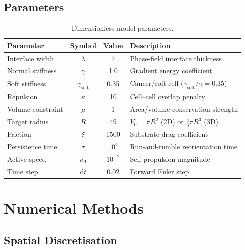 \documentclass[11pt]{article}
\newcommand{\vA}{v_{\!A}}
\newcommand{\taut}{\tau}
\begin{document}
\subsection{Parameters}

\begin{table}[H]
\centering
\caption{Dimensionless model parameters.}
\label{tab:params}
\begin{tabular}{lccl}
\toprule
Parameter & Symbol & Value & Description \\
\midrule
Interface width     & $\lambda$ & 7          & Phase-field interface thickness \\
Normal stiffness    & $\gamma$  & 1.0        & Gradient energy coefficient \\
Soft stiffness      & $\gamma_{\mathrm{soft}}$ & 0.35 & Cancer/soft cell ($\gamma_{\mathrm{soft}}/\gamma = 0.35$) \\
Repulsion           & $\kappa$  & 10         & Cell--cell overlap penalty \\
Volume constraint   & $\mu$     & 1          & Area/volume conservation strength \\
Target radius       & $R$       & 49         & $V_0 = \pi R^2$ (2D) or $\frac{4}{3}\pi R^3$ (3D) \\
Friction            & $\xi$     & 1500       & Substrate drag coefficient \\
Persistence time    & $\taut$   & $10^4$     & Run-and-tumble reorientation time \\
Active speed        & $\vA$     & $10^{-2}$  & Self-propulsion magnitude \\
Time step           & $\mathrm{d}t$ & 0.02   & Forward Euler step \\
\bottomrule
\end{tabular}
\end{table}

\section{Numerical Methods}
\label{sec:numerics}

\subsection{Spatial Discretisation}
\end{document}
